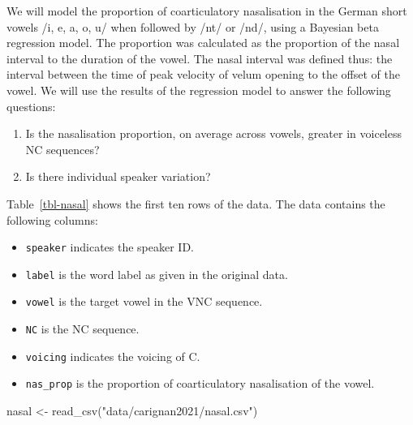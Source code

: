 \documentclass[
  authoryear,
  preprint,
  3p]{elsarticle}
\newenvironment{Shaded}{\begin{snugshade}}{\end{snugshade}}
\newcommand{\FunctionTok}[1]{\textcolor[rgb]{0.28,0.35,0.67}{#1}}
\newcommand{\NormalTok}[1]{\textcolor[rgb]{0.00,0.23,0.31}{#1}}
\newcommand{\OtherTok}[1]{\textcolor[rgb]{0.00,0.23,0.31}{#1}}
\newcommand{\StringTok}[1]{\textcolor[rgb]{0.13,0.47,0.30}{#1}}
\providecommand{\tightlist}{%
  \setlength{\itemsep}{0pt}\setlength{\parskip}{0pt}}\usepackage{longtable,booktabs,array}
\begin{document}
We will model the proportion of coarticulatory nasalisation in the
German short vowels /i, e, a, o, u/ when followed by /nt/ or /nd/, using
a Bayesian beta regression model. The proportion was calculated as the
proportion of the nasal interval to the duration of the vowel. The nasal
interval was defined thus: the interval between the time of peak
velocity of velum opening to the offset of the vowel. We will use the
results of the regression model to answer the following questions:

\begin{enumerate}
\def\labelenumi{\arabic{enumi}.}
\tightlist
\item
  Is the nasalisation proportion, on average across vowels, greater in
  voiceless NC sequences?
\item
  Is there individual speaker variation?
\end{enumerate}

Table~\ref{tbl-nasal} shows the first ten rows of the data. The data
contains the following columns:

\begin{itemize}
\item
  \texttt{speaker} indicates the speaker ID.
\item
  \texttt{label} is the word label as given in the original data.
\item
  \texttt{vowel} is the target vowel in the VNC sequence.
\item
  \texttt{NC} is the NC sequence.
\item
  \texttt{voicing} indicates the voicing of C.
\item
  \texttt{nas\_prop} is the proportion of coarticulatory nasalisation of
  the vowel.
\end{itemize}

\begin{Shaded}
\begin{Highlighting}[]
\NormalTok{nasal }\OtherTok{\textless{}{-}} \FunctionTok{read\_csv}\NormalTok{(}\StringTok{"data/carignan2021/nasal.csv"}\NormalTok{)}
\end{Highlighting}
\end{Shaded}
\end{document}
